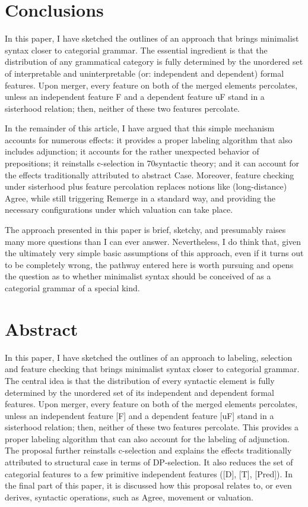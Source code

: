 \documentclass[output=paper
,modfonts
,nonflat]{langsci/langscibook}
\begin{document}
\section{Conclusions}
In this paper, I have sketched the outlines of an approach that brings minimalist syntax closer to categorial grammar. The essential ingredient is that the distribution of any grammatical category is fully determined by the unordered set of interpretable and uninterpretable (or: independent and dependent) formal features. Upon merger, every feature on both of the merged elements percolates, unless an independent feature {\lbrack}F{\rbrack} and a dependent feature {\lbrack}uF{\rbrack} stand in a sisterhood relation; then, neither of these two features percolate.

In the remainder of this article, I have argued that this simple mechanism accounts for numerous effects: it provides a proper labeling algorithm that also includes adjunction; it accounts for the rather unexpected behavior of prepositions; it reinstalls c-selection in 70syntactic theory; and it can account for the effects traditionally attributed to abstract Case. Moreover, feature checking under sisterhood plus feature percolation replaces notions like (long-distance) Agree, while still triggering Remerge in a standard way, and providing the necessary configurations under which valuation can take place.

The approach presented in this paper is brief, sketchy, and presumably raises many more questions than I can ever answer. Nevertheless, I do think that, given the ultimately very simple basic assumptions of this approach, even if it turns out to be completely wrong, the pathway entered here is worth pursuing and opens the question as to whether minimalist syntax should be conceived of as a categorial grammar of a special kind. 

\section{Abstract}
	In this paper, I have sketched the outlines of an approach to labeling, selection and feature checking that brings minimalist syntax closer to categorial grammar. The central idea is that the distribution of every syntactic element is fully determined by the unordered set of its independent and dependent formal features. Upon merger, every feature on both of the merged elements percolates, unless an independent feature [F] and a dependent feature [uF] stand in a sisterhood relation; then, neither of these two features percolate. This provides a proper labeling algorithm that can also account for the labeling of adjunction. The proposal further reinstalls c-selection and explains the effects traditionally attributed to structural case in terms of DP-selection. It also reduces the set of categorial features to a few primitive independent features ([D], [T], [Pred]). In the final part of this paper, it is discussed how this proposal relates to, or even derives, syntactic operations, such as Agree, movement or valuation. 


\printbibliography[heading=subbibliography,notkeyword=this]
\end{document}
